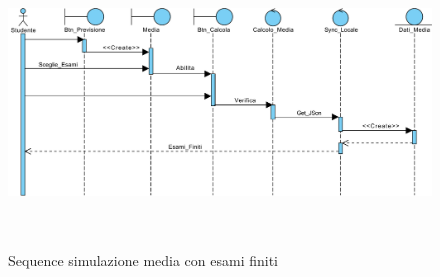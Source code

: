 \begin{figure}[H]
	\centering
	\includegraphics[height=3in]{imgs/gruppo3/sequence-media-esami-finiti.pdf}
	\caption{Sequence simulazione media con esami finiti}
	\label{fig:prova}
\end{figure}

